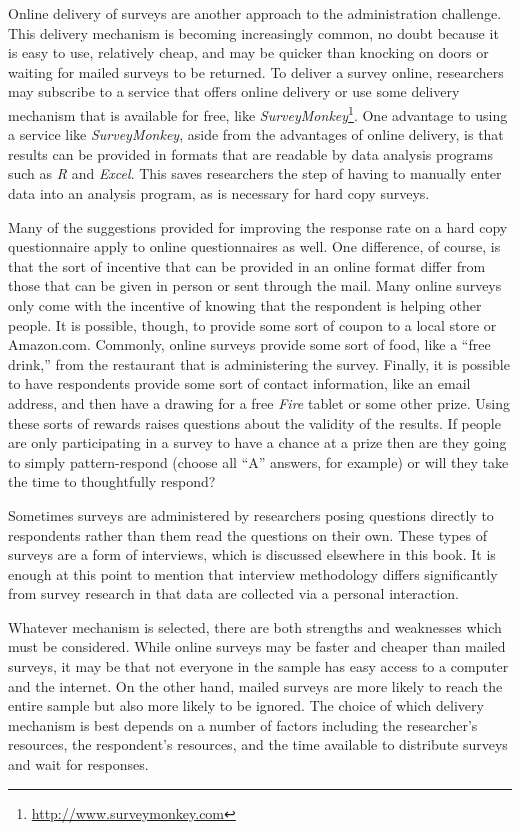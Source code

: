 Online delivery of surveys are another approach to the administration challenge. This delivery mechanism is becoming increasingly common, no doubt because it is easy to use, relatively cheap, and may be quicker than knocking on doors or waiting for mailed surveys to be returned. To deliver a survey online, researchers may subscribe to a service that offers online delivery or use some delivery mechanism that is available for free, like \textit{SurveyMonkey}\footnote{\url{http://www.surveymonkey.com}}. One advantage to using a service like \textit{SurveyMonkey}, aside from the advantages of online delivery, is that results can be provided in formats that are readable by data analysis programs such as \textit{R} and \textit{Excel}. This saves researchers the step of having to manually enter data into an analysis program, as is necessary for hard copy surveys.

Many of the suggestions provided for improving the response rate on a hard copy questionnaire apply to online questionnaires as well. One difference, of course, is that the sort of incentive that can be provided in an online format differ from those that can be given in person or sent through the mail. Many online surveys only come with the incentive of knowing that the respondent is helping other people. It is possible, though, to provide some sort of coupon to a local store or Amazon.com. Commonly, online surveys provide some sort of food, like a ``free drink,'' from the restaurant that is administering the survey. Finally, it is possible to have respondents provide some sort of contact information, like an email address, and then have a drawing for a free \textit{Fire} tablet or some other prize. Using these sorts of rewards raises questions about the validity of the results. If people are only participating in a survey to have a chance at a prize then are they going to simply pattern-respond (choose all ``A'' answers, for example) or will they take the time to thoughtfully respond?

Sometimes surveys are administered by researchers posing questions directly to respondents rather than them read the questions on their own. These types of surveys are a form of interviews, which is discussed elsewhere in this book. It is enough at this point to mention that interview methodology differs significantly from survey research in that data are collected via a personal interaction. 

Whatever mechanism is selected, there are both strengths and weaknesses which must be considered. While online surveys may be faster and cheaper than mailed surveys, it may be that not everyone in the sample has easy access to a computer and the internet. On the other hand, mailed surveys are more likely to reach the entire sample but also more likely to be ignored. The choice of which delivery mechanism is best depends on a number of factors including the researcher's resources, the respondent's resources, and the time available to distribute surveys and wait for responses.

